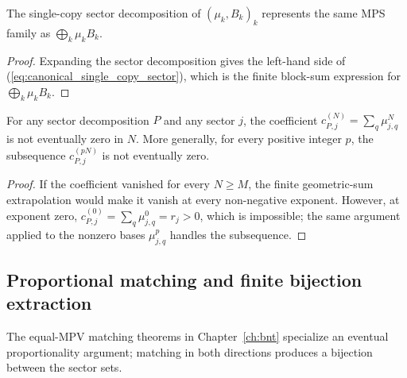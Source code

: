 \begin{lemma}
    \label{lem:trivial_sector_decomp_same_mpv}
    \leanok
    The single-copy sector decomposition of $(\mu_k,B_k)_k$ represents the same
    MPS family as $\bigoplus_k\mu_kB_k$.
\end{lemma}

\begin{proof}\leanok
    Expanding the sector decomposition gives the left-hand side of
    (\ref{eq:canonical_single_copy_sector}), which is the finite block-sum
    expression for $\bigoplus_k\mu_kB_k$.
\end{proof}

\begin{lemma}
    \label{lem:sector_decomposition_coeff_not_eventually_zero}
    \leanok
    For any sector decomposition $P$ and any sector $j$, the coefficient
    $c_{P,j}^{(N)}=\sum_q\mu_{j,q}^N$ is not eventually zero in $N$.  More
    generally, for every positive integer $p$, the subsequence
    $c_{P,j}^{(pN)}$ is not eventually zero.
\end{lemma}

\begin{proof}\leanok
    If the coefficient vanished for every $N\geq M$, the finite geometric-sum
    extrapolation would make it vanish at every non-negative exponent. However,
    at exponent zero, $c_{P,j}^{(0)}=\sum_q\mu_{j,q}^0=r_j>0$, which is
    impossible; the same argument applied to the nonzero bases $\mu_{j,q}^p$
    handles the subsequence.
\end{proof}

\subsection{Proportional matching and finite bijection extraction}
\label{subsec:app_bnt_proportional_matching}

The equal-MPV matching theorems in Chapter~\ref{ch:bnt} specialize an eventual
proportionality argument; matching in both directions produces a bijection
between the sector sets.

